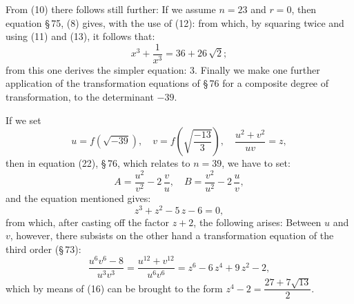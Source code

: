 From (10) there follows still further:
If we assume $n=23$ and $r=0$, then equation \S\,75, (8) gives, with the use
of (12):
from which, by squaring twice and using (11) and (13), it follows that:
\[
x^3+\frac{1}{x^3}=36+26\,\sqrt2;
\]
from this one derives the simpler equation:
3. Finally we make one further application of the transformation equations
of \S\,76 for a composite degree of transformation, to the determinant
$-39$.

If we set
\[
u=f(\sqrt{-39}),\quad v=f\!\left(\sqrt{\dfrac{-13}{3}}\right),\quad \frac{u^2+v^2}{uv}=z,
\]
then in equation (22), \S\,76, which relates to $n=39$, we have to set:
\[
A=\frac{u^2}{v^2}-2\,\frac{v}{u},\quad B=\frac{v^2}{u^2}-2\,\frac{u}{v},
\]
and the equation mentioned gives:
\[
z^3+z^2-5\,z-6=0,
\]
from which, after casting off the factor $z+2$, the following arises:
Between $u$ and $v$, however, there subsists on the other hand a
transformation equation of the third order (\S\,73):
\[
\frac{u^6v^6-8}{u^3v^3}=\frac{u^{12}+v^{12}}{u^6v^6}=z^6-6\,z^4+9\,z^2-2,
\]
which by means of (16) can be brought to the form $z^4-2=\dfrac{27+7\sqrt{13}}{2}$.
